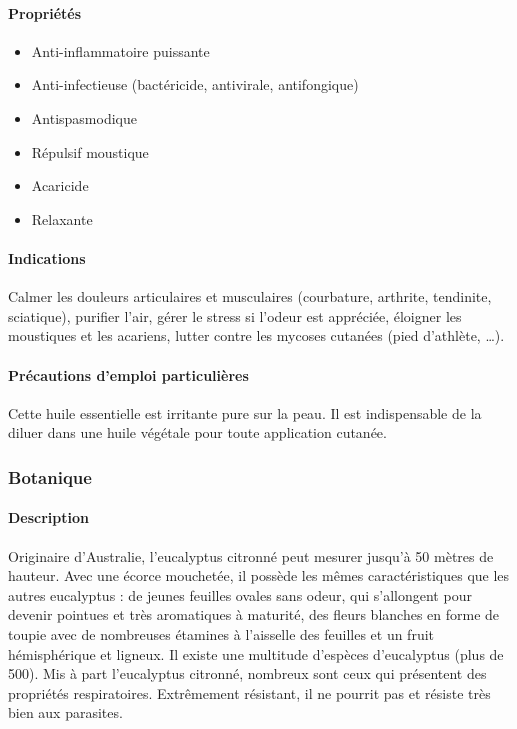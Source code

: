 \documentclass[12pt,a4wide]{article}
\begin{document}
\paragraph{Propriétés}
\label{sec-4-5-1-2}
\begin{itemize}
\item Anti-inflammatoire puissante
\item Anti-infectieuse (bactéricide, antivirale, antifongique)
\item Antispasmodique
\item Répulsif moustique
\item Acaricide
\item Relaxante
\end{itemize}

\paragraph{Indications}
\label{sec-4-5-1-3}

Calmer les douleurs articulaires et musculaires (courbature, arthrite, tendinite, sciatique), purifier l'air, gérer le stress si l'odeur est appréciée, éloigner les moustiques et les acariens, lutter contre les mycoses cutanées (pied d'athlète, \ldots{}).

\paragraph{Précautions d'emploi particulières}
\label{sec-4-5-1-4}
Cette huile essentielle est irritante pure sur la peau. Il est indispensable de la diluer dans une huile végétale pour toute application cutanée.
\subsubsection{Botanique}
\label{sec-4-5-2}
\paragraph{Description}
\label{sec-4-5-2-1}

Originaire d'Australie, l'eucalyptus citronné peut  mesurer jusqu'à 50 mètres de
hauteur. Avec  une écorce mouchetée,  il possède les mêmes  caractéristiques que
les autres  eucalyptus : de jeunes  feuilles ovales sans odeur,  qui s'allongent
pour devenir  pointues et très  aromatiques à  maturité, des fleurs  blanches en
forme de  toupie avec  de nombreuses  étamines à l'aisselle  des feuilles  et un
fruit hémisphérique et ligneux.  Il  existe une multitude d'espèces d'eucalyptus
(plus  de  500). Mis  à  part  l'eucalyptus  citronné,  nombreux sont  ceux  qui
présentent des  propriétés respiratoires.  Extrêmement résistant, il  ne pourrit
pas et résiste très bien aux parasites.
\end{document}
